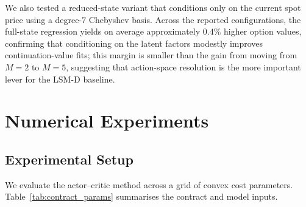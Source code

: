 \documentclass[a4paper,fleqn]{cas-dc}
\begin{document}
We also tested a reduced-state variant that conditions only on the current spot price using a degree-$7$ Chebyshev basis. Across the reported configurations, the full-state regression yields on average approximately $0.4\%$ higher option values, confirming that conditioning on the latent factors modestly improves continuation-value fits; this margin is smaller than the gain from moving from $M = 2$ to $M = 5$, suggesting that action-space resolution is the more important lever for the LSM-D baseline.


\section{Numerical Experiments}
\label{sec:experiments}

\subsection{Experimental Setup}

We evaluate the actor--critic method across a grid of convex cost parameters. Table~\ref{tab:contract_params} summarises the contract and model inputs.
\end{document}
